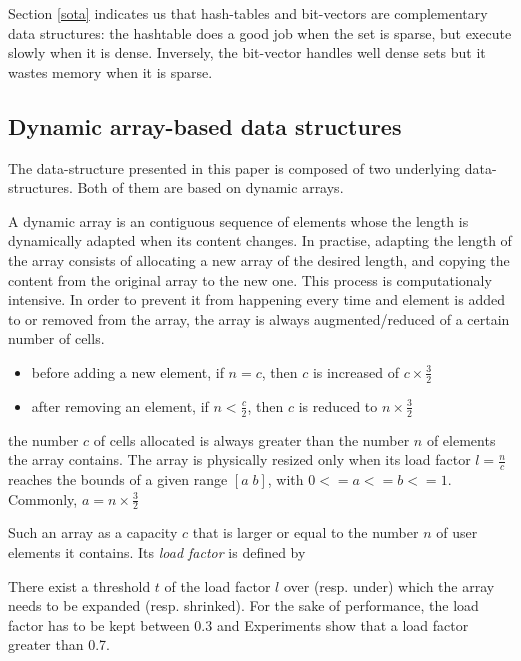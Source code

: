 \documentclass{article}
\begin{document}
Section \ref{sota} indicates us that hash-tables and bit-vectors are
complementary data structures: the hashtable does a good job when the set is
sparse, but execute slowly when it is dense. Inversely, the bit-vector handles well dense sets but it wastes memory when it is sparse. 





\subsection{Dynamic array-based data structures}
\label{nca}

The data-structure presented in this paper is composed of two underlying
data-structures. Both of them are based on dynamic arrays.

A dynamic
array is an contiguous sequence of elements whose the length is dynamically
adapted when its content changes. In practise, adapting the length of the array
consists of allocating  a new array of the desired length, and copying the content from the
original array to the new one. This process is computationaly intensive. In
order to prevent it from happening every time and element is added to or
removed from the array, the array is always
augmented/reduced of a certain number of cells.
\begin{itemize}
  \item before adding a new element, if $n = c$, then $c$ is increased of $c
  \times \frac{3}{2}$
  \item after removing an element, if $n < \frac{c}{2}$, then $c$ is
  reduced to $n  \times \frac{3}{2}$
\end{itemize}



the number $c$ of cells allocated is always greater than
the number $n$ of elements the array contains. The array is physically resized only when its load
factor $l = \frac{n}{c}$ reaches the bounds of a given range $[a\; b]$, with
$0 <= a <= b <= 1$. Commonly, $a = n \times \frac{3}{2}$


Such an array as a capacity $c$ that
is larger or equal to the number $n$ of user elements it contains.
Its \textit{load factor}    is defined by

There exist a threshold $t$  of the load factor $l$ over (resp. under) which the
array needs to be expanded (resp. shrinked).
For the sake of performance, the load factor has to be kept between 0.3 and Experiments show that a load factor greater than 0.7.
\end{document}
